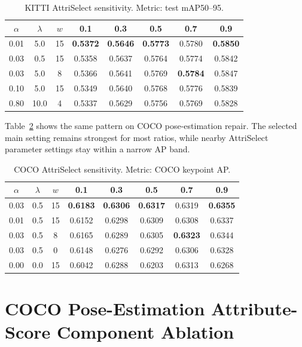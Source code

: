 \documentclass{article}
\newcommand{\model}{AttriSelect\xspace}
\begin{document}
\begin{table}[h]
\centering
\caption{KITTI \model sensitivity. Metric: test mAP50--95.}
\label{tab:kitti-rpc-sensitivity}
\small
\setlength{\tabcolsep}{4pt}
\begin{tabular}{c c c c c c c c}
\toprule
$\alpha$ & $\lambda$ & $w$ & 0.1 & 0.3 & 0.5 & 0.7 & 0.9 \\
\midrule
0.01 & 5.0 & 15 & \textbf{0.5372} & \textbf{0.5646} & \textbf{0.5773} & 0.5780 & \textbf{0.5850} \\
0.03 & 0.5 & 15 & 0.5358 & 0.5637 & 0.5764 & 0.5774 & 0.5842 \\
0.03 & 5.0 & 8 & 0.5366 & 0.5641 & 0.5769 & \textbf{0.5784} & 0.5847 \\
0.10 & 5.0 & 15 & 0.5349 & 0.5640 & 0.5768 & 0.5776 & 0.5839 \\
0.80 & 10.0 & 4 & 0.5337 & 0.5629 & 0.5756 & 0.5769 & 0.5828 \\
\bottomrule
\end{tabular}
\end{table}

Table~\ref{tab:coco-rpc-sensitivity} shows the same pattern on COCO pose-estimation repair. The selected main setting remains strongest for most ratios, while nearby \model parameter settings stay within a narrow AP band.

\begin{table}[h]
\centering
\caption{COCO \model sensitivity. Metric: COCO keypoint AP.}
\label{tab:coco-rpc-sensitivity}
\small
\setlength{\tabcolsep}{4pt}
\begin{tabular}{c c c c c c c c}
\toprule
$\alpha$ & $\lambda$ & $w$ & 0.1 & 0.3 & 0.5 & 0.7 & 0.9 \\
\midrule
0.03 & 0.5 & 15 & \textbf{0.6183} & \textbf{0.6306} & \textbf{0.6317} & 0.6319 & \textbf{0.6355} \\
0.01 & 0.5 & 15 & 0.6152 & 0.6298 & 0.6309 & 0.6308 & 0.6337 \\
0.03 & 0.5 & 8 & 0.6165 & 0.6289 & 0.6305 & \textbf{0.6323} & 0.6344 \\
0.03 & 0.5 & 0 & 0.6148 & 0.6276 & 0.6292 & 0.6306 & 0.6328 \\
0.00 & 0.0 & 15 & 0.6042 & 0.6288 & 0.6203 & 0.6313 & 0.6268 \\
\bottomrule
\end{tabular}
\end{table}

\section{COCO Pose-Estimation Attribute-Score Component Ablation}
\label{app:coco-rpc-ablation}
\end{document}
